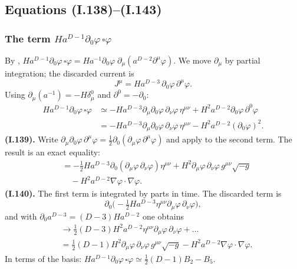 \subsection{Equations (I.138)--(I.143)}

\subsubsection{\texorpdfstring{The term $Ha^{D-1}\partial_0\varphi\,\square\varphi$}{The term H a**(D-1) d0 phi Box phi}}
\tD{}
By , $Ha^{D-1}\partial_0\varphi\,\square\varphi=Ha^{-1}\partial_0\varphi\;\partial_\mu(a^{D-2}\partial^\mu\varphi)$.
We move $\partial_\mu$ by partial integration; the discarded current is
\begin{equation*}
J^\mu=Ha^{D-3}\,\partial_0\varphi\,\partial^\mu\varphi .
\end{equation*}
Using $\partial_\mu(a^{-1})=-H\delta^0_\mu$ and $\partial^0=-\partial_0$:
\begin{equation*}
\begin{aligned}
Ha^{D-1}\partial_0\varphi\,\square\varphi&\simeq-Ha^{D-3}\partial_\mu\partial_0\varphi\,\partial_\nu\varphi\,\eta^{\mu\nu}+H^2a^{D-2}\partial_0\varphi\,\partial^0\varphi\\
&=-Ha^{D-3}\partial_\mu\partial_0\varphi\,\partial_\nu\varphi\,\eta^{\mu\nu}-H^2a^{D-2}(\partial_0\varphi)^2 .
\end{aligned}
\tag{I.138}
\end{equation*}
\textbf{(I.139).} Write $\partial_\mu\partial_0\varphi\,\partial^\mu\varphi=\tfrac12\partial_0(\partial_\mu\varphi\,\partial^\mu\varphi)$ and apply  to the second term. The result is an exact equality:
\begin{equation*}
\begin{aligned}
&=-\tfrac12Ha^{D-3}\partial_0(\partial_\mu\varphi\,\partial_\nu\varphi)\eta^{\mu\nu}+H^2\partial_\mu\varphi\,\partial_\nu\varphi\,g^{\mu\nu}\sqrt{-g}\\
&\quad-H^2a^{D-2}\nabla\varphi\cdot\nabla\varphi .
\end{aligned}
\tag{I.139}
\end{equation*}
\textbf{(I.140).} The first term is integrated by parts in time. The discarded term is
\begin{equation*}
\partial_0\Big(-\tfrac12Ha^{D-3}\eta^{\mu\nu}\partial_\mu\varphi\,\partial_\nu\varphi\Big),
\end{equation*}
and with $\partial_0a^{D-3}=(D-3)Ha^{D-2}$ one obtains
\begin{equation*}
\begin{aligned}
&\to\tfrac12(D-3)H^2a^{D-2}\eta^{\mu\nu}\partial_\mu\varphi\,\partial_\nu\varphi+\ldots\\
&=\tfrac12(D-1)H^2\partial_\mu\varphi\,\partial_\nu\varphi\,g^{\mu\nu}\sqrt{-g}-H^2a^{D-2}\nabla\varphi\cdot\nabla\varphi .
\end{aligned}
\tag{I.140}
\end{equation*}
In terms of the basis: $Ha^{D-1}\partial_0\varphi\,\square\varphi\simeq\tfrac12(D-1)B_2-B_5$.

